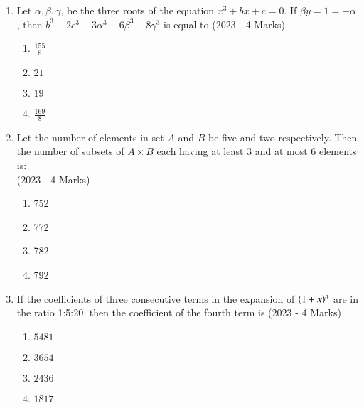 \documentclass[journal]{IEEEtran}
\begin{document}
\begin{enumerate}
{\begin{align*}
4x+3y&=69\\
4y-3x&=17\\
x+7y&=61
\end{align*}
Then $\brak{\alpha-\beta}^2+\alpha+\beta$ is equal to
\hfill
{(2023 - 4 Marks)}
\begin{multicols}{4}
\begin{enumerate}
\item 18
\item 15
\item 16
\item 17
\end{enumerate}
\end{multicols}
}
\item{
Let $\alpha,\beta,\gamma$, be the three roots of the equation $x^3+bx+c=0$. If $\beta y=1=-\alpha$, then $b^3+2c^3-3\alpha^3-6\beta^3-8\gamma^3$ is equal to
\hfill
{(2023 - 4 Marks)}
\begin{multicols}{4}
\begin{enumerate}
\item $\frac{155}{8}$
\item $21$
\item $19$
\item $\frac{169}{8}$
\end{enumerate}
\end{multicols}
}
\item{
Let the number of elements in set $A$ and $B$ be five and two respectively. Then the number of subsets of $A\times B$ each having at least 3 and at most 6 elements is:\\ \text{  } 
\hfill
{(2023 - 4 Marks)}
\begin{multicols}{4}
\begin{enumerate}
\item 752
\item 772
\item 782
\item 792
\end{enumerate}
\end{multicols}
}
\item{
If the coefficients of three consecutive terms in the expansion of $\left(1+x\right)^n$ are in the ratio 1:5:20, then the coefficient of the fourth term is 
\hfill
{(2023 - 4 Marks)}
\begin{multicols}{4}
\begin{enumerate}
\item $5481$
\item $3654$
\item $2436$
\item $1817$
\end{enumerate}
\end{multicols}

}
\end{enumerate}
\end{document}

